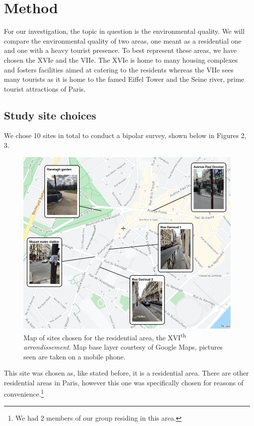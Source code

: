 \documentclass[11pt,letterpaper]{article}
\begin{document}

\section{Method}
\label{sec:method}


For our investigation, the topic in question is the environmental quality. We will compare the environmental quality of two areas, one meant as a residential one and one with a heavy tourist presence. To best represent these areas, we have chosen the XVIe and the VIIe. The XVIe is home to many housing complexes and fosters facilities aimed at catering to the residents whereas the VIIe sees many tourists as it is home to the famed Eiffel Tower and the Seine river, prime tourist attractions of Paris.

\subsection{Study site choices}

We chose 10 sites in total to conduct a bipolar survey, shown below in Figures 2, 3.

\begin{figure}[H]
    \begin{minipage}{\textwidth}
        \centering
        \includegraphics[width=0.7\linewidth]{media/16esites.png}
        \caption{Map of sites chosen for the residential area, the XVI\textsuperscript{th} \textit{arrondissement}. Map base layer courtesy of Google Maps, pictures seen are taken on a mobile phone.}
    \end{minipage}
\end{figure}

This site was chosen as, like stated before, it is a residential area. There are other residential areas in Paris, however this one was specifically chosen for reasons of convenience.\footnote{We had 2 members of our group residing in this area.}
\end{document}
